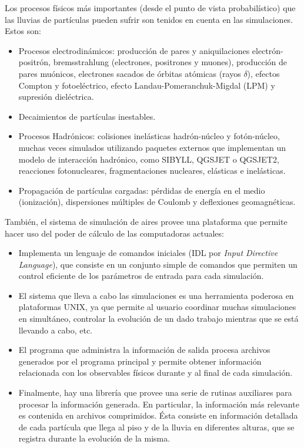 	Los procesos físicos m\'as importantes (desde el punto de vista probabilístico) que las lluvias de part\'iculas pueden sufrir son tenidos en cuenta en las simulaciones. 
	Estos son:

	\begin{itemize}
	\item Procesos electrodin\'amicos: producci\'on de pares y aniquilaciones electr\'on-positr\'on, bremsstrahlung (electrones, positrones y muones), producci\'on de pares mu\'onicos, electrones sacados de \'orbitas at\'omicas (rayos $\delta$), efectos Compton y fotoel\'ectrico, efecto Landau-Pomeranchuk-Migdal (LPM) y supresi\'on diel\'ectrica.
	\item Decaimientos de part\'iculas inestables.
	\item Procesos Hadr\'onicos: colisiones inel\'asticas hadr\'on-n\'ucleo y fot\'on-n\'ucleo, muchas veces simulados utilizando paquetes externos que implementan un modelo de interacci\'on hadr\'onico, como SIBYLL, QGSJET o QGSJET2, reacciones fotonucleares, fragmentaciones nucleares, elásticas e inelásticas.
	\item Propagaci\'on de part\'iculas cargadas: pérdidas de energ\'ia en el medio (ionizaci\'on), dispersiones múltiples de Coulomb y deflexiones geomagn\'eticas.
	\end{itemize}    

	Tambi\'en, el sistema de simulación de {\sc aires} provee una plataforma que permite hacer uso del poder de c\'alculo de las computadoras actuales:
	
	\begin{itemize}
	\item Implementa un lenguaje de comandos iniciales (IDL por {\em Input Directive Language}), que consiste en un conjunto simple de comandos que permiten un control eficiente de los par\'ametros de entrada para cada simulación. 
	\item El sistema que lleva a cabo las simulaciones es una herramienta poderosa en plataformas UNIX, ya que permite al usuario coordinar muchas simulaciones en simultáneo, controlar la evolución de un dado trabajo mientras que se está llevando a cabo, etc.
	\item El programa que administra la información de salida procesa archivos generados por el programa principal y permite obtener información relacionada con los observables físicos durante y al final de cada simulación.
	\item Finalmente, hay una librería que provee una serie de rutinas auxiliares para procesar la información generada. En particular, la información m\'as relevante es contenida en archivos comprimidos. \'Esta consiste en informaci\'on detallada de cada part\'icula que llega al piso y de la lluvia en diferentes alturas, que se registra durante la evolución de la misma.
	\end{itemize}
	

